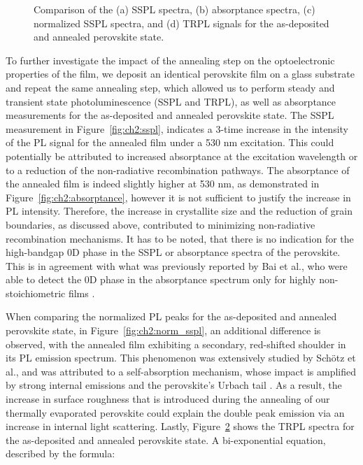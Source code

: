 \begin{figure}[ht!]
\begin{subfigure}[t]{0.4\textwidth}
        \caption{}
        \label{fig:ch2:trpl}
    \end{subfigure}
    \caption{Comparison of the (a) SSPL spectra, (b) absorptance spectra, (c) normalized SSPL spectra, and (d) TRPL signals for the as-deposited and annealed perovskite state.}
\end{figure}



To further investigate the impact of the annealing step on the optoelectronic properties of the film, we deposit an identical perovskite film on a glass substrate and repeat the same annealing step, which allowed us to perform steady and transient state photoluminescence (SSPL and TRPL), as well as absorptance measurements for the as-deposited and annealed perovskite state. The SSPL measurement in Figure~\ref{fig:ch2:sspl}, indicates a 3-time increase in the intensity of the PL signal for the annealed film under a 530 nm excitation. This could potentially be attributed to increased absorptance at the excitation wavelength or to a reduction of the non-radiative recombination pathways. The absorptance of the annealed film is indeed slightly higher at 530 nm, as demonstrated in Figure~\ref{fig:ch2:absorptance}, however it is not sufficient to justify the increase in PL intensity. Therefore, the increase in crystallite size and the reduction of grain boundaries, as discussed above, contributed to minimizing non-radiative recombination mechanisms. It has to be noted, that there is no indication for the high-bandgap 0D  phase in the SSPL or absorptance spectra of the perovskite. This is in agreement with what was previously reported by Bai et al., who were able to detect the 0D phase in the absorptance spectrum only for highly non-stoichiometric films \cite{Bai2019AStability}. 

When comparing the normalized PL peaks for the as-deposited and annealed perovskite state, in Figure~\ref{fig:ch2:norm_sspl}, an additional difference is observed, with the annealed film exhibiting a secondary, red-shifted shoulder in its PL emission spectrum. This phenomenon was extensively studied by Schötz et al., and was attributed to a self-absorption mechanism, whose impact is amplified by strong internal emissions and the perovskite's Urbach tail \cite{Schotz2020DoubleSelf-absorption}. As a result, the increase in surface roughness that is introduced during the annealing of our thermally evaporated perovskite could explain the double peak emission via an increase in internal light scattering. Lastly, Figure~\ref{fig:ch2:trpl} shows the TRPL spectra for the as-deposited and annealed perovskite state. A bi-exponential equation, described by the formula: 

